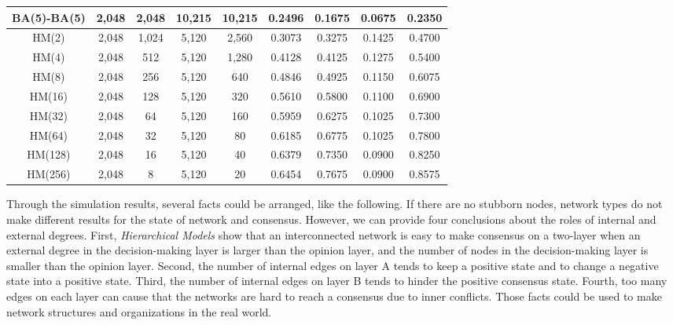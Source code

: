 \begin{table}[!htb]
\begin{center}
\begin{tabular}{c|c|c|c|c|c|c|c|c}
			BA(5)-BA(5)            & 2,048 	& 2,048   & 10,215  & 10,215  &  0.2496   & 0.1675 & 0.0675 & 0.2350   \\ \hline
			HM(2)  				   & 2,048 	& 1,024   & 5,120   & 2,560   &  0.3073   & 0.3275 & 0.1425 & 0.4700   \\ \hline    
			HM(4) 				   & 2,048 	&  512    & 5,120   & 1,280   &  0.4128   & 0.4125 & 0.1275 & 0.5400   \\ \hline
			HM(8)  				   & 2,048 	&  256    & 5,120   & 640     &  0.4846   & 0.4925 & 0.1150 & 0.6075   \\ \hline
			HM(16)				   & 2,048 	&  128    & 5,120   & 320     &  0.5610   & 0.5800 & 0.1100 & 0.6900   \\ \hline
			HM(32) 				   & 2,048 	&   64    & 5,120   & 160     &  0.5959   & 0.6275 & 0.1025 & 0.7300   \\ \hline
			HM(64) 				   & 2,048 	&   32    & 5,120   & 80      &  0.6185   & 0.6775 & 0.1025 & 0.7800   \\ \hline 
			HM(128) 			   & 2,048 	&   16    & 5,120   & 40      &  0.6379   & 0.7350 & 0.0900 & 0.8250   \\ \hline 
			HM(256) 			   & 2,048 	&    8    & 5,120   & 20      &  0.6454   & 0.7675 & 0.0900 & 0.8575   \\ \hline 
			 \hline
		\end{tabular}
	\end{center}
\end{table} 

Through the simulation results, several facts could be arranged, like the following. If there are no stubborn nodes, network types do not make different results for the state of network and consensus. However, we can provide four conclusions about the roles of internal and external degrees. First, \textit{Hierarchical Models} show that an interconnected network is easy to make consensus on a two-layer when an external degree in the decision-making layer is larger than the opinion layer, and the number of nodes in the decision-making layer is smaller than the opinion layer. Second, the number of internal edges on layer A tends to keep a positive state and to change a negative state into a positive state. Third, the number of internal edges on layer B tends to hinder the positive consensus state. Fourth, too many edges on each layer can cause that the networks are hard to reach a consensus due to inner conflicts. Those facts could be used to make network structures and organizations in the real world. \\
